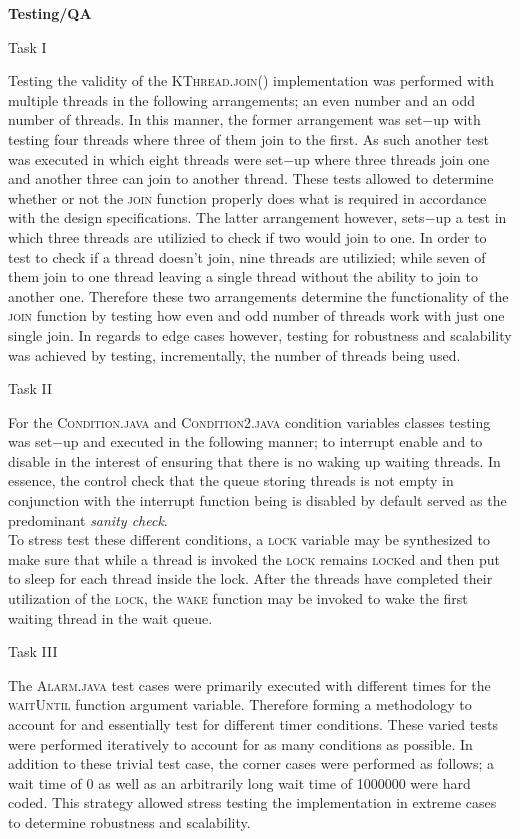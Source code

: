 \documentclass[12pt]{article}
\begin{document}
{\setlength{\parindent}{0cm}
\textbf{Testing/QA} \begin{center}Task I\end{center}
Testing the validity of the \textsc{KThread.join()} implementation was performed with multiple threads in the following arrangements; an even number and an odd number of threads. In this manner, the former arrangement was set$-$up with testing four threads where three of them join to the first. As such another test was executed in which eight threads were set$-$up where three threads join one and another three can join to another thread. These tests allowed to determine whether or not the \textsc{join} function properly does what is required in accordance with the design specifications. The latter arrangement however, sets$-$up a test in which three threads are utilizied to check if two would join to one. In order to test to check if a thread doesn’t join, nine threads are utilizied; while seven of them join to one thread leaving a single thread without the ability to join to another one. Therefore these two arrangements determine the functionality of the \textsc{join} function by testing how even and odd number of threads work with just one single join. In regards to edge cases however, testing for robustness and scalability was achieved by testing, incrementally, the number of threads being used. 
\begin{center}Task II\end{center}
	For the \textsc{Condition.java} and \textsc{Condition2.java} condition variables classes testing was set$-$up and executed in the following manner; to interrupt enable and to disable in the interest of ensuring that there is no waking up waiting threads. In essence, the control check that the queue storing threads is not empty in conjunction with the interrupt function being is disabled by default served as the predominant \textit{sanity check}.\\ To stress test these different conditions, a \textsc{lock} variable may be synthesized to make sure that while a thread is invoked the \textsc{lock} remains \textsc{lock}ed and then put to sleep for each thread inside the {lock}. After the threads have completed their utilization of the \textsc{lock}, the \textsc{wake} function may be invoked to wake the first waiting thread in the wait queue.
\begin{center}Task III\end{center}
The \textsc{Alarm.java} test cases were primarily executed with different times for the \textsc{waitUntil} function argument variable. Therefore forming a methodology to account for and essentially test for different timer conditions. These varied tests were performed iteratively to account for as many conditions as possible. In addition to these trivial test case, the corner cases were performed as follows; a wait time of 0 as well as an arbitrarily long wait time of 1000000 were hard coded. This strategy allowed stress testing the implementation in extreme cases to determine robustness and scalability.
}
\end{document}
